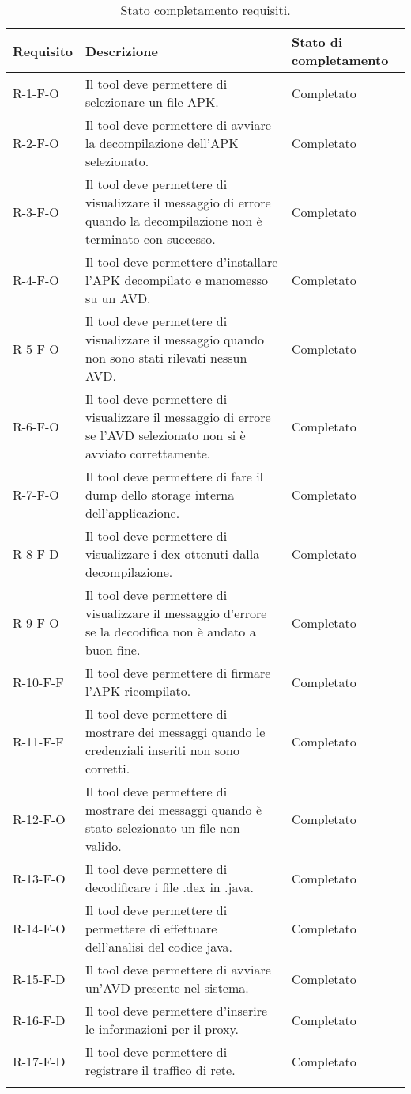 \begin{longtable}{| C{3cm}|C{7cm} |C{3cm}|}
    \hline
    \textbf{Requisito} & \textbf{Descrizione}                                & \textbf{Stato di completamento} \\\hline
    R-1-F-O            & Il tool deve permettere di selezionare un file APK. & Completato                      \\\hline
    R-2-F-O & Il tool deve permettere di avviare la decompilazione dell'APK selezionato.
    & Completato \\\hline
    R-3-F-O & Il tool deve permettere di visualizzare il messaggio di errore quando la decompilazione non è terminato con successo.
    & Completato \\\hline
    R-4-F-O & Il tool deve permettere d'installare l'APK decompilato e manomesso su un AVD.
    & Completato \\\hline
    R-5-F-O & Il tool deve permettere di visualizzare il messaggio quando non sono stati rilevati nessun AVD.
    & Completato \\\hline
    R-6-F-O & Il tool deve permettere di visualizzare il messaggio di errore se l'AVD selezionato non si è avviato correttamente.
    & Completato \\\hline
    R-7-F-O & Il tool deve permettere di fare il dump dello storage interna dell'applicazione.
    & Completato \\\hline
    R-8-F-D & Il tool deve permettere di visualizzare i dex ottenuti dalla decompilazione.
    & Completato \\\hline
    R-9-F-O & Il tool deve permettere di visualizzare il messaggio d'errore se la decodifica non è andato a buon fine.
    & Completato \\\hline
    R-10-F-F & Il tool deve permettere di firmare l'APK ricompilato.
    & Completato \\\hline
    R-11-F-F & Il tool deve permettere di mostrare dei messaggi quando le credenziali inseriti non sono corretti.
    & Completato \\\hline
    R-12-F-O & Il tool deve permettere di mostrare dei messaggi quando è stato selezionato un file non valido.
    & Completato \\\hline
    R-13-F-O & Il tool deve permettere di decodificare i file .dex in .java.
    & Completato \\\hline
    R-14-F-O & Il tool deve permettere di permettere di effettuare dell'analisi del codice java.
    & Completato \\\hline
    R-15-F-D & Il tool deve permettere di avviare un'AVD presente nel sistema.
    & Completato \\\hline
    R-16-F-D & Il tool deve permettere d'inserire le informazioni per il proxy.
    & Completato \\\hline
    R-17-F-D & Il tool deve permettere di registrare il traffico di rete.
    & Completato \\\hline
    \caption{Stato completamento requisiti.}
\end{longtable}
